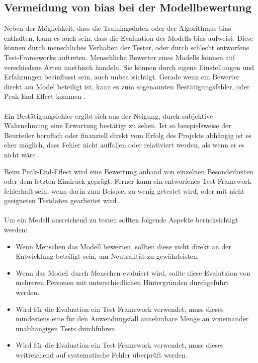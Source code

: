 \documentclass[hidelinks,12pt]{report}
\begin{document}
\subsection{Vermeidung von \Gls{bias}  bei der Modellbewertung}
Neben der Möglichkeit, dass die Trainingsdaten oder der Algorithmus \Gls{bias}  enthalten, kann es auch sein, dass die Evaluation des Modells \Gls{bias}  aufweist.
Diese können durch menschliches Verhalten der Tester, oder durch schlecht entworfene Test-Frameworks auftreten. Menschliche Bewerter eines Modells können auf verschiedene Arten unethisch handeln. Sie können durch eigene Einstellungen und Erfahrungen beeinflusst sein, auch unbeabsichtigt. Gerade wenn ein Bewerter direkt am Model beteiligt ist, kann es zum sogenannten Bestätigungsfehler, oder \glqq Peak-End-Effect\grqq{} kommen \cite[S. 54f.]{Srinivasan}. 
\\\\
Ein Bestätigungsfehler ergibt sich aus der Neigung, durch subjektive Wahrnehmung eine Erwartung bestätigt zu sehen. Ist so beispielsweise der Beurteiler beruflich oder finanziell direkt vom Erfolg des Projekts abhängig ist es eher möglich, dass Fehler nicht auffallen oder relativiert werden, als wenn er es nicht wäre \cite[S. 54f.]{Srinivasan}.

\newpage

Beim \glqq Peak-End-Effect\grqq{} wird eine Bewertung anhand von einzelnen Besonderheiten oder dem letzten Eindruck geprägt. Ferner kann ein entworfenes Test-Framework fehlerhaft sein, wenn darin zum Beispiel zu wenig getestet wird, oder mit nicht geeigneten Testdaten gearbeitet wird \cite[S. 54f.]{Srinivasan}.
\\\\
Um ein Modell ausreichend zu testen sollten folgende Aspekte berücksichtigt werden:%
\\
\begin{itemize}
    \item Wenn Menschen das Modell bewerten, sollten diese nicht direkt an der Entwicklung beteiligt sein, um Neutralität zu gewährleisten.
    \item Wenn das Modell durch Menschen evaluiert wird, sollte diese Evalutaion von mehreren Personen mit unterschiedlichen Hintergründen durchgeführt werden.
    \item Wird für die Evaluation ein Test-Framework verwendet, muss dieses mindestens eine für den Anwendungsfall annehmbare Menge an voneinander unabhängigen Tests durchführen.
    \item Wird für die Evaluation ein Test-Framework verwendet, muss dieses weitreichend auf systematische Fehler überprüft werden.
\end{itemize}
\end{document}
